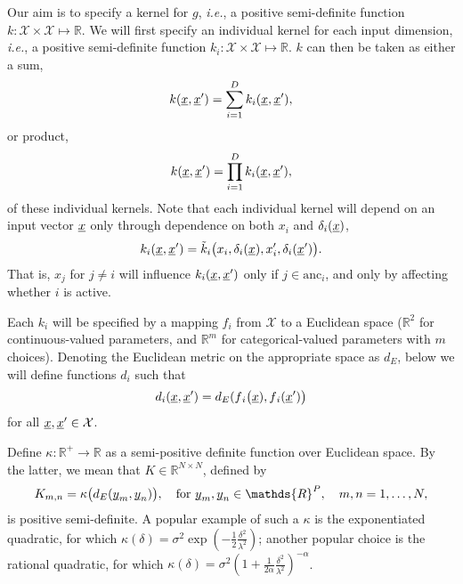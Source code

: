\documentclass[letterpaper]{article}
\newcommand{\vect}[1]{\underline{\smash{#1}}}
\renewcommand{\v}[1]{\vect{#1}}
\newcommand{\reals}{\mathds{R}}
\newcommand{\sX}{\mathcal{X}}
\begin{document}
Our aim is to specify a kernel for $g$, \emph{i.e.}, a positive semi-definite function  $k\colon \sX \times \sX \mapsto \reals$. We will first specify an individual kernel for each input dimension, \emph{i.e.}, a positive semi-definite function $k_i\colon \sX \times \sX \mapsto \reals$. $k$ can then be taken as either a sum,
\begin{equation}
 k(\v{x}, \v{x}') = \sum_{i=1}^D k_i(\v{x},\v{x}'),
\end{equation}
or product,
\begin{equation}
 k(\v{x}, \v{x}') = \prod_{i=1}^D k_i(\v{x},\v{x}'),
\end{equation}
of these individual kernels. Note that each individual kernel will depend on an  input vector $\v{x}$ only through dependence on both $x_i$ and $\delta_i(\v{x})$,
\begin{equation}
  k_i(\v{x},\v{x}') = \tilde{k}_i\bigl(x_i,\delta_i(\v{x}),x_i', \delta_i(\v{x}') \bigr).
\end{equation}
That is, $x_j$ for $j\neq i$ will influence $k_i(\v{x},\v{x}')$ only if $j \in \text{anc}_i$, and only by affecting whether $i$ is active.



Each $k_i$ will be specified by a mapping $f_i$ from
$\sX$ 
to a Euclidean space ($\reals^2$ for continuous-valued parameters, and $\reals^m$ for categorical-valued parameters with $m$ choices). Denoting the Euclidean metric on the appropriate space as $d{_E}$, below we will define functions $d{_i}$ such that
\begin{equation}
 d{_i}(\v{x},\v{x}')
=
d_E(f{_i}\bigl(\v{x}), f{_i}(\v{x}')\bigr)
\end{equation}
for all $\v{x}, \v{x}' \in \sX$.

Define $\kappa\colon \reals^+ \to \reals$ as a semi-positive definite function over Euclidean space. By the latter, we mean that $K \in \reals^{N\times N}$, defined by 
\begin{equation}
 K_{m, n} = \kappa\bigl(d_E(\v{y}_m, \v{y}_n)\bigr),\quad \text{for }
\v{y}_m, \v{y}_n \in \reals^P,\quad m, n = 1, \ldots, N, 
\end{equation}
is positive semi-definite. A popular example of such a $\kappa$ is the exponentiated quadratic, for which $\kappa(\delta) = \sigma^2 \exp(-\frac{1}{2} \frac{\delta^2}{\lambda^2})$; another popular choice is the rational quadratic, for which $\kappa(\delta) = \sigma^2 (1+\frac{1}{2\alpha} \frac{\delta^2}{\lambda^2})^{-\alpha}$.
\end{document}
